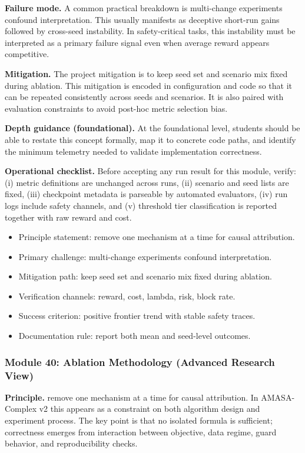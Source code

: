 \documentclass[conference]{IEEEtran}
\begin{document}
\textbf{Failure mode.} A common practical breakdown is multi-change experiments confound interpretation. This usually manifests as deceptive short-run gains followed by cross-seed instability. In safety-critical tasks, this instability must be interpreted as a primary failure signal even when average reward appears competitive.

\textbf{Mitigation.} The project mitigation is to keep seed set and scenario mix fixed during ablation. This mitigation is encoded in configuration and code so that it can be repeated consistently across seeds and scenarios. It is also paired with evaluation constraints to avoid post-hoc metric selection bias.

\textbf{Depth guidance (foundational).} At the foundational level, students should be able to restate this concept formally, map it to concrete code paths, and identify the minimum telemetry needed to validate implementation correctness.

\textbf{Operational checklist.} Before accepting any run result for this module, verify: (i) metric definitions are unchanged across runs, (ii) scenario and seed lists are fixed, (iii) checkpoint metadata is parseable by automated evaluators, (iv) run logs include safety channels, and (v) threshold tier classification is reported together with raw reward and cost.

\begin{itemize}[leftmargin=*]
  \item Principle statement: remove one mechanism at a time for causal attribution.
  \item Primary challenge: multi-change experiments confound interpretation.
  \item Mitigation path: keep seed set and scenario mix fixed during ablation.
  \item Verification channels: reward, cost, lambda, risk, block rate.
  \item Success criterion: positive frontier trend with stable safety traces.
  \item Documentation rule: report both mean and seed-level outcomes.
\end{itemize}


\subsubsection{Module 40: Ablation Methodology (Advanced Research View)}
\textbf{Principle.} remove one mechanism at a time for causal attribution. In AMASA-Complex v2 this appears as a constraint on both algorithm design and experiment process. The key point is that no isolated formula is sufficient; correctness emerges from interaction between objective, data regime, guard behavior, and reproducibility checks.
\end{document}
